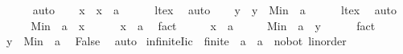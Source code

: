 \begin{isabellebody}
\ \ \ \ \isamarkupfalse%
\ auto\isanewline
\ \ \isamarkupfalse%
\ x\ \ {\isachardoublequoteopen}x\ {\isacharless}{\kern0pt}\ a{\isachardoublequoteclose}\isanewline
\ \ \ \ \isamarkupfalse%
\ lt{\isacharunderscore}{\kern0pt}ex\ \isamarkupfalse%
\ auto\isanewline
\isanewline
\ \ \isamarkupfalse%
\ y\ \ {\isachardoublequoteopen}y\ {\isacharless}{\kern0pt}\ Min\ {\isacharbraceleft}{\kern0pt}{\isachardot}{\kern0pt}{\isachardot}{\kern0pt}{\isacharless}{\kern0pt}\ a{\isacharbraceright}{\kern0pt}{\isachardoublequoteclose}\isanewline
\ \ \ \ \isamarkupfalse%
\ lt{\isacharunderscore}{\kern0pt}ex\ \isamarkupfalse%
\ auto\isanewline
\ \ \isamarkupfalse%
\ \isamarkupfalse%
\ {\isachardoublequoteopen}Min\ {\isacharbraceleft}{\kern0pt}{\isachardot}{\kern0pt}{\isachardot}{\kern0pt}{\isacharless}{\kern0pt}\ a{\isacharbraceright}{\kern0pt}\ {\isasymle}\ x{\isachardoublequoteclose}\isanewline
\ \ \ \ \isamarkupfalse%
\ {\isacartoucheopen}x\ {\isacharless}{\kern0pt}\ a{\isacartoucheclose}\ \isamarkupfalse%
\ fact\isanewline
\ \ \isamarkupfalse%
\ \isamarkupfalse%
\ {\isacartoucheopen}x\ {\isacharless}{\kern0pt}\ a{\isacartoucheclose}\isanewline
\ \ \isamarkupfalse%
\ \isamarkupfalse%
\ {\isachardoublequoteopen}Min\ {\isacharbraceleft}{\kern0pt}{\isachardot}{\kern0pt}{\isachardot}{\kern0pt}{\isacharless}{\kern0pt}\ a{\isacharbraceright}{\kern0pt}\ {\isasymle}\ y{\isachardoublequoteclose}\isanewline
\ \ \ \ \isamarkupfalse%
\ fact\isanewline
\ \ \isamarkupfalse%
\ {\isacartoucheopen}y\ {\isacharless}{\kern0pt}\ Min\ {\isacharbraceleft}{\kern0pt}{\isachardot}{\kern0pt}{\isachardot}{\kern0pt}{\isacharless}{\kern0pt}\ a{\isacharbraceright}{\kern0pt}{\isacartoucheclose}\ \isamarkupfalse%
\ False\ \isamarkupfalse%
\ auto\isanewline
{}\isamarkupfalse%
%
\endisatagproof
{\isafoldproof}%
%
\isadelimproof
\isanewline
%
\endisadelimproof
\isanewline
{}\isamarkupfalse%
\ infinite{\isacharunderscore}{\kern0pt}Iic{\isacharcolon}{\kern0pt}\ {\isachardoublequoteopen}{\isasymnot}\ finite\ {\isacharbraceleft}{\kern0pt}{\isachardot}{\kern0pt}{\isachardot}{\kern0pt}\ a\ {\isacharcolon}{\kern0pt}{\isacharcolon}{\kern0pt}\ {\isacharprime}{\kern0pt}a\ {\isacharcolon}{\kern0pt}{\isacharcolon}{\kern0pt}\ {\isacharbraceleft}{\kern0pt}no{\isacharunderscore}{\kern0pt}bot{\isacharcomma}{\kern0pt}\ linorder{\isacharbraceright}{\kern0pt}{\isacharbraceright}{\kern0pt}{\isachardoublequoteclose}\isanewline

\end{isabellebody}
